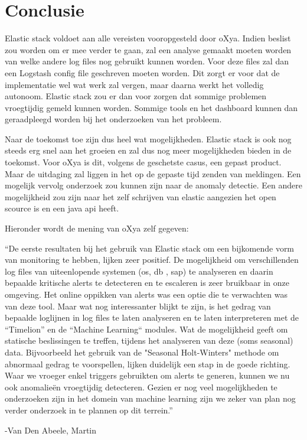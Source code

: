 
\chapter{Conclusie}
\label{ch:conclusie}

Elastic stack voldoet aan alle vereisten vooropgesteld door oXya. Indien beslist zou worden om er mee verder te gaan, zal een analyse gemaakt moeten worden van welke andere log files nog gebruikt kunnen worden. Voor deze files zal dan een Logstash config file geschreven moeten worden. 
Dit zorgt er voor dat de implementatie wel wat werk zal vergen, maar daarna werkt het volledig autonoom. Elastic stack zou er dan voor zorgen dat sommige problemen vroegtijdig gemeld kunnen worden. Sommige tools en het dashboard kunnen dan geraadpleegd worden bij het onderzoeken van het probleem.

Naar de toekomst toe zijn dus heel wat mogelijkheden. Elastic stack is ook nog steeds erg snel aan het groeien en zal dus nog meer mogelijkheden bieden in de toekomst. Voor oXya is dit, volgens de geschetste casus, een gepast product. Maar de uitdaging zal liggen in het op de gepaste tijd zenden van meldingen.
Een mogelijk vervolg onderzoek zou kunnen zijn naar de anomaly detectie.
Een andere mogelijkheid zou zijn naar het zelf schrijven van elastic aangezien het open scource is en een java api heeft.

Hieronder wordt de mening van oXya zelf gegeven:


	``De eerste resultaten bij het gebruik van Elastic stack om een bijkomende vorm van monitoring te hebben, lijken zeer positief. 
	De mogelijkheid om verschillenden log files van uiteenlopende systemen (os, db , sap) te analyseren en daarin bepaalde kritische alerts te detecteren en te escaleren is zeer bruikbaar in onze omgeving. 
	Het online oppikken van alerts was een optie die te verwachten was van deze tool. 
	Maar wat nog interessanter blijkt te zijn, is het gedrag van bepaalde loglijnen in log files te laten analyseren en te laten interpreteren met de “Timelion” en de “Machine Learning“ modules.
	Wat de mogelijkheid geeft om statische beslissingen te treffen, tijdens het analyseren van deze (soms seasonal) data. 
	Bijvoorbeeld het gebruik van de "Seasonal Holt-Winters" methode om abnormaal gedrag te voorspellen, lijken duidelijk een stap in de goede richting. 
	Waar we vroeger enkel triggers gebruikten om alerts te generen, kunnen we nu ook anomalieën vroegtijdig detecteren. 
	Gezien er nog veel mogelijkheden te onderzoeken zijn in het domein van machine learning zijn we zeker van plan nog verder onderzoek in te plannen op dit terrein.''
	\begin{flushright} 
		-Van Den Abeele, Martin
    \end{flushright}
